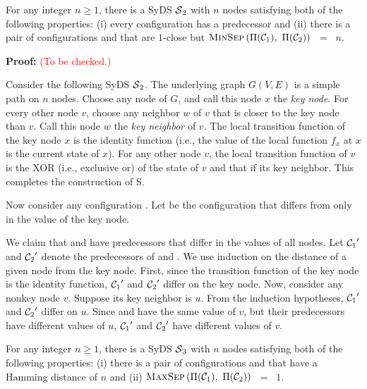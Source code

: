 
\begin{proposition}\label{pro:close-far}
For any integer $n \geq 1$,
there is a SyDS $\mbox{$\mathcal{S}$}_2${} with $n$
nodes satisfying both of the following properties: 
(i) every configuration has a predecessor and (ii) 
there is a pair of configurations
\calcone{} and \calctwo{} that are $1$-close but 
$\mbox{\textsc{MinSep}}\left( \mbox{$\Pi(\mbox{$\mathcal{C}_{1}$})$},~ \mbox{$\Pi(\mbox{$\mathcal{C}_{2}$})$} \right)$ ~=~ $n$.
\end{proposition}

\noindent
\textbf{Proof:} \textcolor{red}{(To be checked.)}

Consider the following SyDS $\mbox{$\mathcal{S}$}_2$.
The underlying graph $G(V,E)$ is a simple path on $n$ nodes.
Choose any node of $G$, and call this node $x$ the {\em key node}. For
every other node $v$, choose any neighbor $w$ of $v$ that is closer to the
key node than $v$. Call this node $w$ the {\em key neighbor} of $v$.
The local transition function of the key node $x$ is the identity
function (i.e., the value of the local function $f_x$ at $x$ is
the current state of $x$).
For any other node $v$, the local transition function of
$v$ is the XOR (i.e., exclusive or) of the state of $v$ 
and that if its key neighbor.
This completes the construction of S.

Now consider any configuration \calcone. 
Let \calctwo{} be the configuration that differs 
from \calcone{} only in the value of the key node.

We claim that \calcone{} and \calctwo{} have predecessors that differ in the
values of all nodes. 
Let $\mbox{$\mathcal{C}_{1}$}'$ and $\mbox{$\mathcal{C}_{2}$}'$ denote the predecessors of
\calcone{} and \calctwo.
We use induction on the distance of a given node from the key node.
First, since the transition function of the key node is the identity function,
$\mbox{$\mathcal{C}_{1}$}'$ and $\mbox{$\mathcal{C}_{2}$}'$ differ on the key node.
Now, consider any nonkey node $v$.  Suppose its key neighbor is $u$.
From the induction hypotheses, $\mbox{$\mathcal{C}_{1}$}'$ and $\mbox{$\mathcal{C}_{2}$}'$ differ on $u$.
Since \calcone{} and \calctwo{} have the same value of $v$, 
but their predecessors have different values of $u$, 
$\mbox{$\mathcal{C}_{1}$}'$ and $\mbox{$\mathcal{C}_{2}$}'$ have different values of $v$. \QED

\begin{proposition}\label{pro:close-far}
For any integer $n \geq 1$,
there is a SyDS $\mbox{$\mathcal{S}$}_3${} with $n$
nodes satisfying both of the following properties: 
(i) there is a pair of configurations
\calcone{} and \calctwo{} that have a Hamming distance of $n$  and 
(ii) $\mbox{\textsc{MaxSep}}\left( \mbox{$\Pi(\mbox{$\mathcal{C}_{1}$})$},~ \mbox{$\Pi(\mbox{$\mathcal{C}_{2}$})$} \right)$ ~=~ $1$.
\end{proposition}
